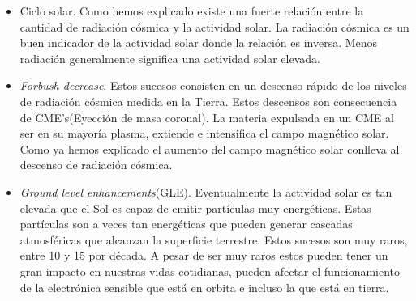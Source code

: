 	\begin{itemize}
		\item	Ciclo solar. Como hemos explicado existe una fuerte relación entre la cantidad de radiación cósmica y la actividad solar. La
			radiación cósmica es un buen indicador de la actividad solar donde la relación es inversa. Menos radiación generalmente
			significa una actividad solar elevada.
		\item	\emph{Forbush decrease}\cite{Forbush1938}. Estos sucesos consisten en un descenso rápido de los niveles de radiación cósmica medida
			en la Tierra. Estos descensos son consecuencia de CME's(Eyección de masa coronal). La materia expulsada en un CME al ser en su
			mayoría plasma, extiende e intensifica el campo magnético solar. Como ya hemos explicado el aumento del campo magnético solar
			conlleva al descenso de radiación cósmica.
		\item	\emph{Ground level enhancements}(GLE). Eventualmente la actividad solar es tan elevada que el Sol es capaz de emitir partículas muy
			energéticas. Estas partículas son a veces tan energéticas que pueden generar cascadas atmosféricas que alcanzan la superficie
			terrestre. Estos sucesos son muy raros, entre 10 y 15 por década. A pesar de ser muy raros estos pueden tener un gran impacto
			en nuestras vidas cotidianas, pueden afectar el funcionamiento de la electrónica sensible que está en orbita e incluso la que
			está en tierra.   
	\end{itemize}

